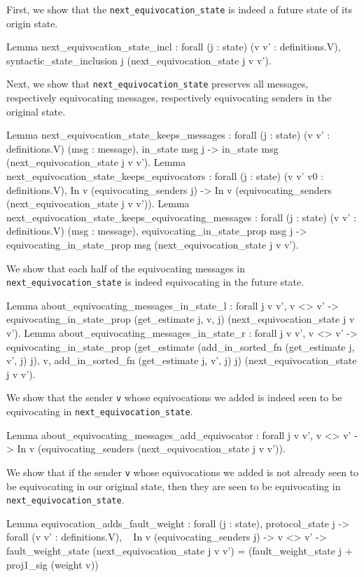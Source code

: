 \documentclass[runningheads]{llncs}
\begin{document}
First, we show that the \verb|next_equivocation_state| is indeed a future state of its origin state.
\begin{coq}
Lemma next_equivocation_state_incl :
	forall (j : state) (v v' : definitions.V),
	syntactic_state_inclusion j (next_equivocation_state j v v').
\end{coq}
Next, we show that \verb|next_equivocation_state|  preserves all messages, respectively equivocating messages, respectively equivocating senders in the original state.
\begin{coq}
Lemma next_equivocation_state_keeps_messages :
	forall (j : state) (v v' : definitions.V) (msg : message),
	in_state msg j ->
	in_state msg (next_equivocation_state j v v').
Lemma next_equivocation_state_keeps_equivocators :
	forall (j : state) (v v' v0 : definitions.V),
	In v (equivocating_senders j) ->
	In v (equivocating_senders (next_equivocation_state j v v')).
Lemma next_equivocation_state_keeps_equivocating_messages :
	forall (j : state) (v v' : definitions.V) (msg : message),
	equivocating_in_state_prop msg j ->
	equivocating_in_state_prop msg (next_equivocation_state j v v').
\end{coq}
We show that each half of the equivocating messages in \verb|next_equivocation_state|  is indeed equivocating in the future state.
\begin{coq}
Lemma about_equivocating_messages_in_state_l :
	forall j v v',
	v <> v' ->
	equivocating_in_state_prop (get_estimate j, v, j)
	(next_equivocation_state j v v').
Lemma about_equivocating_messages_in_state_r :
	forall j v v',
	v <> v' ->
	equivocating_in_state_prop (get_estimate (add_in_sorted_fn
	(get_estimate j, v', j) j), v,
	add_in_sorted_fn (get_estimate j, v', j) j)
	(next_equivocation_state j v v').
\end{coq}
We show that the sender \verb|v| whose equivocations we added is indeed seen to be equivocating in \verb|next_equivocation_state|.
\begin{coq}
Lemma about_equivocating_messages_add_equivocator :
	forall j v v',
	v <> v' ->
	In v (equivocating_senders (next_equivocation_state j v v')).
\end{coq}
We show that if the sender \verb|v| whose equivocations we added is not already seen to be equivocating in our original state, then they are seen to be equivocating in \verb|next_equivocation_state|.
\begin{coq}
Lemma equivocation_adds_fault_weight :
	forall (j : state),
	protocol_state j ->
	forall (v v' : definitions.V),
	~ In v (equivocating_senders j) ->
	v <> v' -> 
	fault_weight_state (next_equivocation_state j v v') =
	(fault_weight_state j + proj1_sig (weight v))%
\end{coq}
\end{document}
